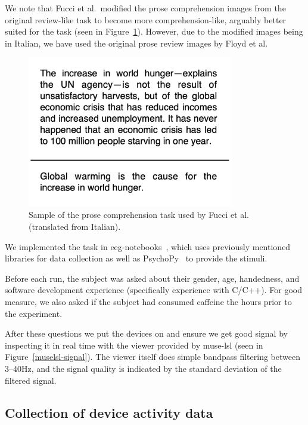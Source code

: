             We note that Fucci et al.~modified the prose comprehension images from the original review-like task to become more comprehension-like, arguably better suited for the task (seen in Figure~\ref{fig:prose-comp-fucci}). However, due to the modified images being in Italian, we have used the original prose review images by Floyd et al.

            \begin{figure}[H]
                \centering
                \includegraphics[width=90mm]{img/prose-comprehension.png}
                \caption{Sample of the prose comprehension task used by Fucci et al. (translated from Italian).}\label{fig:prose-comp-fucci}
            \end{figure}

            We implemented the task in eeg-notebooks~\cite{barachant_eeg-notebooks_2020}, which uses previously mentioned libraries for data collection as well as PsychoPy~\cite{peirce_psychopy2_2019} to provide the stimuli.

            Before each run, the subject was asked about their gender, age, handedness, and software development experience (specifically experience with C/C++). For good measure, we also asked if the subject had consumed caffeine the hours prior to the experiment.

            After these questions we put the devices on and ensure we get good signal by inspecting it in real time with the viewer provided by muse-lsl (seen in Figure~\ref{muselsl-signal}). The viewer itself does simple bandpass filtering between 3--40Hz, and the signal quality is indicated by the standard deviation of the filtered signal.

    \subsection{Collection of device activity data}\label{section:collect-usage}

